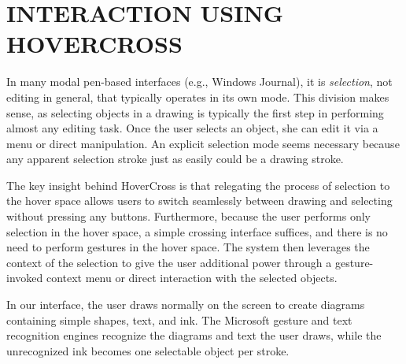 \documentclass{article}
\begin{document}



\section{INTERACTION USING HOVERCROSS}

In many modal pen-based interfaces (e.g., Windows Journal), it is
\textit{selection}, not editing in general, that typically
operates in its own mode.  This division makes sense, as selecting
objects in a drawing is typically the first step in performing almost
any editing task.  Once the user selects an object, she can edit it
via a menu or direct manipulation.  An explicit selection mode seems
necessary because any apparent selection stroke just as easily could
be a drawing stroke.

The key insight behind HoverCross is that relegating the process of
selection to the hover space allows users to switch seamlessly between
drawing and selecting without pressing any buttons.  Furthermore,
because the user performs only selection in the hover space, a simple
crossing interface suffices, and there is no need to perform gestures
in the hover space.  The system then leverages the context of the
selection to give the user additional power through a
gesture-invoked context menu or direct interaction with the selected
objects.

In our interface, the user draws normally on the screen to create
diagrams containing simple shapes, text, and ink.  The Microsoft gesture and text
recognition engines recognize the diagrams and text the
user draws, while the unrecognized ink becomes one selectable object per stroke.
\end{document}
